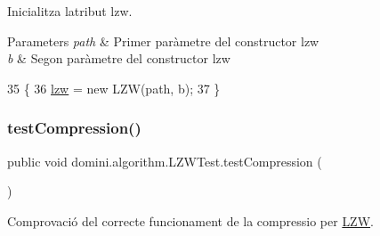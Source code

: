 Inicialitza l\textquotesingle{}atribut lzw. 


\begin{DoxyParams}{Parameters}
{\em path} & Primer paràmetre del constructor lzw \\
\hline
{\em b} & Segon paràmetre del constructor lzw \\
\hline
\end{DoxyParams}

\begin{DoxyCode}
35                                                     \{
36         \hyperlink{classdomini_1_1algorithm_1_1LZWTest_a591c1bb9b927631d0e60a2853e502d20}{lzw} = \textcolor{keyword}{new} LZW(path, b);
37     \}
\end{DoxyCode}
\mbox{\label{classdomini_1_1algorithm_1_1LZWTest_ae43f1a846dc9672b04c707314006a878}} 
\subsubsection{\texorpdfstring{test\+Compression()}{testCompression()}}
{\footnotesize\ttfamily public void domini.\+algorithm.\+L\+Z\+W\+Test.\+test\+Compression (\begin{DoxyParamCaption}{ }\end{DoxyParamCaption})\hspace{0.3cm}{\ttfamily [inline]}}



Comprovació del correcte funcionament de la compressio per \hyperlink{classdomini_1_1algorithm_1_1LZW}{L\+ZW}. 



